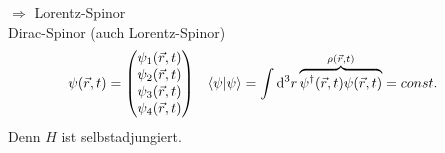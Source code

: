 $\Rightarrow$ Lorentz-Spinor
\\
Dirac-Spinor (auch Lorentz-Spinor)
	\begin{align*}
		\psi (\vec{r}, t) &=
		\begin{pmatrix}
		\psi_1 (\vec{r}, t) \\
		\psi_2 (\vec{r}, t) \\
		\psi_3 (\vec{r}, t) \\
		\psi_4 (\vec{r}, t)
		\end{pmatrix} &
		\braket{\psi | \psi}
		&= \int \diff^3 r 
		\overbrace{\psi^\dagger (\vec{r}, t) \psi (\vec{r}, t)}^{\mathclap{\rho (\vec{r}, t)}} 
		= const.
	\end{align*}
Denn $H$ ist selbstadjungiert. 

